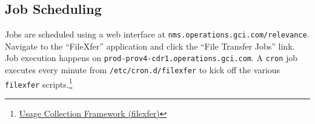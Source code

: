 
\subsection{Job Scheduling}
Jobs are scheduled using a web interface at
\texttt{nms.operations.gci.com/relevance}.  Navigate to the
``FileXfer'' application and click the ``File Transfer Jobs'' link.
Job execution happens on \texttt{prod-prov4-cdr1.operations.gci.com}.
A \texttt{cron} job executes every minute from
\texttt{/etc/cron.d/filexfer} to kick off the various \texttt{filexfer}
scripts.\footnote{\href{http://oss-wiki.operations.gci.com/dev/index.php/Usage\_Collection\_Framework\_(filexfer)}{Usage
    Collection Framework (filexfer)}}




